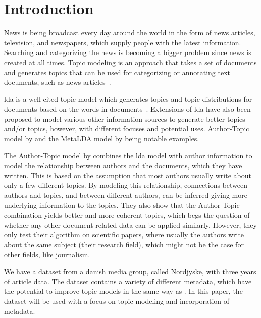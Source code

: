 \section{Introduction}\label{sec:introduction}
News is being broadcast every day around the world in the form of news articles, television, and newspapers, which supply people with the latest information.
Searching and categorizing the news is becoming a bigger problem since news is created at all times.
Topic modeling is an approach that takes a set of documents and generates topics that can be used for categorizing or annotating text documents, such as news articles~\cite{Probabilistic_Topic_Models}.

\Gls{lda} is a well-cited topic model which generates topics and topic distributions for documents based on the words in documents~\cite{blei2003latent}.
Extensions of \gls{lda} have also been proposed to model various other information sources to generate better topics and/or topics, however, with different focuses and potential uses.
Author-Topic model by \citet{author_topic_2012} and the MetaLDA model by \citet{MetaLDA2017} being notable examples.

The Author-Topic model by \citet{author_topic_2012} combines the \gls{lda} model with author information to model the relationship between authors and the documents, which they have written.
This is based on the assumption that most authors usually write about only a few different topics.
By modeling this relationship, connections between authors and topics, and between different authors, can be inferred giving more underlying information to the topics.
They also show that the Author-Topic combination yields better and more coherent topics, which begs the question of whether any other document-related data can be applied similarly.
However, they only test their algorithm on scientific papers, where usually the authors write about the same subject (their research field), which might not be the case for other fields, like journalism. 

We have a dataset from a danish media group, called Nordjyske, with three years of article data.
The dataset contains a variety of different metadata, which have the potential to improve topic models in the same way as \citet{author_topic_2012}. 
In this paper, the dataset will be used with a focus on topic modeling and incorporation of metadata.

